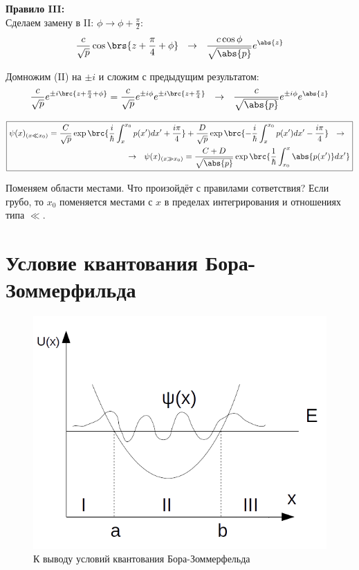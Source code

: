 \textbf{Правило III:} \\
Сделаем замену в II: $\phi \to \phi + \frac{\pi}{2}$:
$$
\frac{c}{\sqrt{p}}\cos\brs{z+\frac{\pi}{4} + \phi} ~~\rightarrow~~ \frac{c\cos{\phi}}{\sqrt{\abs{p}}} e^{\abs{z}}
$$

Домножим (II) на $\pm i$ и сложим с предыдущим результатом:
$$
\frac{c}{\sqrt{p}} e^{\pm i\brc{z+\frac{\pi}{4}+\phi}} = \frac{c}{\sqrt{p}} e^{\pm i \phi} e^{\pm i\brc{z+\frac{\pi}{4}}} ~~\rightarrow~~
\frac{c}{\sqrt{\abs{p}}} e^{\pm i \phi} e^{\abs{z}}
$$

$$
\boxed{
\begin{aligned}
	\psi(x)_{(x \ll x_0)} = \frac{C}{\sqrt{p}} \exp\brc{\frac{i}{\hbar} \int_{x}^{x_0} p(x')dx' + \frac{i\pi}{4}} 
	+ \frac{D}{\sqrt{p}} \exp\brc{-\frac{i}{\hbar} \int_{x}^{x_0} p(x')dx' - \frac{i\pi}{4}} ~~\rightarrow~~ \\
	~~\rightarrow~~ \psi(x)_{(x \gg x_0)} = \frac{C+D}{\sqrt{\abs{p}}} \exp\brc{\frac{1}{\hbar} \int_{x_0}^{x} \abs{p(x')}dx'}
\end{aligned}
}
$$

Поменяем области местами. Что произойдёт с правилами сответствия? Если грубо, то $x_0$ поменяется местами с $x$ в пределах интегрирования и отношениях типа $\ll$.


\section{Условие квантования Бора-Зоммерфильда}

\begin{figure}[h]
\centering
\includegraphics[scale=1]{figs/11_4}
\caption{К выводу условий квантования Бора-Зоммерфельда}
\label{fig:11_4}
\end{figure}

